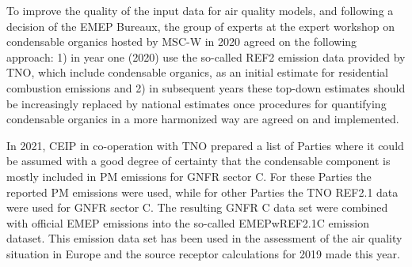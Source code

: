 To improve the quality of the input data for air quality models, and following a decision of the EMEP Bureaux, the group of experts at the expert workshop on condensable organics hosted by MSC-W in 2020 agreed on the following approach: 1) in year one (2020) use the so-called REF2 emission data provided by TNO, which include condensable organics, as an initial estimate for residential combustion emissions and 2) in subsequent years these top-down estimates should be increasingly replaced by national estimates once procedures for quantifying condensable organics in a more harmonized way are agreed on and implemented. 

In 2021, CEIP in co-operation with TNO prepared a list of Parties where it could be assumed with a good degree of certainty that the condensable component is mostly included in PM emissions for GNFR sector C. For these Parties the reported PM emissions were used, while for other Parties the TNO REF2.1 data were used for GNFR sector C. The resulting GNFR C data set were combined with official EMEP emissions into the so-called EMEPwREF2.1C emission dataset. This emission data set has been used in the assessment of the air quality situation in Europe and the source receptor calculations for 2019 made this year. 



